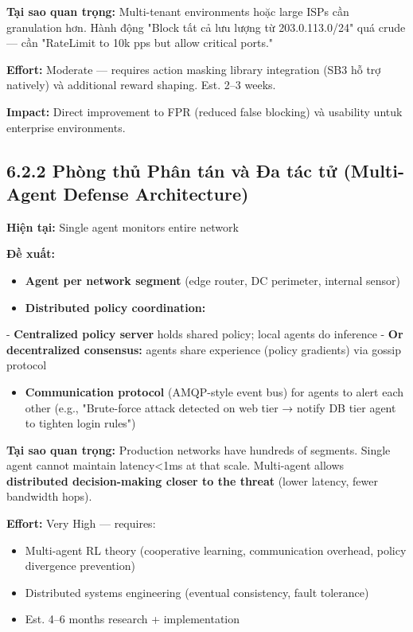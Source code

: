 \documentclass[12pt,a4paper,twoside]{report}
\begin{document}
{{{{{{{{{{{{{\textbf{Tại sao quan trọng:} Multi-tenant environments hoặc large ISPs cần granulation hơn. Hành động "Block tất cả lưu lượng từ 203.0.113.0/24" quá crude — cần "RateLimit to 10k pps but allow critical ports."

\textbf{Effort:} Moderate — requires action masking library integration (SB3 hỗ trợ natively) và additional reward shaping. Est. 2–3 weeks.

\textbf{Impact:} Direct improvement to FPR (reduced false blocking) và usability untuk enterprise environments.


\subsection{6.2.2 Phòng thủ Phân tán và Đa tác tử (Multi-Agent Defense Architecture)}

\textbf{Hiện tại:} Single agent monitors entire network

\textbf{Đề xuất:}
\begin{itemize}
\item \textbf{Agent per network segment} (edge router, DC perimeter, internal sensor)
\item \textbf{Distributed policy coordination:}
\end{itemize}
- \textbf{Centralized policy server} holds shared policy; local agents do inference
- \textbf{Or decentralized consensus:} agents share experience (policy gradients) via gossip protocol
\begin{itemize}
\item \textbf{Communication protocol} (AMQP-style event bus) for agents to alert each other (e.g., "Brute-force attack detected on web tier → notify DB tier agent to tighten login rules")
\end{itemize}

\textbf{Tại sao quan trọng:} Production networks have hundreds of segments. Single agent cannot maintain latency<1ms at that scale. Multi-agent allows \textbf{distributed decision-making closer to the threat} (lower latency, fewer bandwidth hops).

\textbf{Effort:} Very High — requires:
\begin{itemize}
\item Multi-agent RL theory (cooperative learning, communication overhead, policy divergence prevention)
\item Distributed systems engineering (eventual consistency, fault tolerance)
\item Est. 4–6 months research + implementation
\end{itemize}

}}}}}}}}}}}}}
\end{document}
